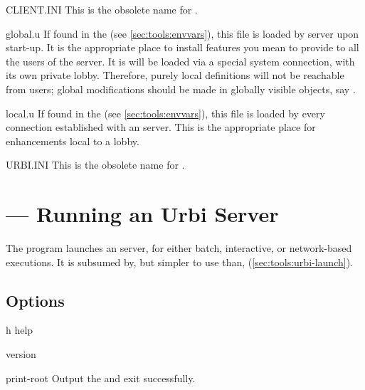 \begin{files}
\item[CLIENT.INI] This is the obsolete name for .

\item[global.u] If found in the  (see
  \autoref{sec:tools:envvars}), this file is loaded by \urbi server upon
  start-up.  It is the appropriate place to install features you
  mean to provide to all the users of the server.  It is will be
  loaded via a special system connection, with its own private lobby.
  Therefore, purely local definitions will not be reachable from
  users; global modifications should be made in globally visible
  objects, say .

\item[local.u] If found in the  (see
  \autoref{sec:tools:envvars}), this file is loaded by every
  connection established with an \urbi server.  This is the
  appropriate place for enhancements local to a lobby.

\item[URBI.INI] This is the obsolete name for .
\end{files}

\section{ --- Running an Urbi Server}
\label{sec:tools:urbi}

The  program launches an \urbi server, for either batch,
interactive, or network-based executions.  It is subsumed by, but simpler to
use than,  (\autoref{sec:tools:urbi-launch}).

\subsection{Options}

\begin{options}
\item[h]{help} \optionHelp
\item{version} \optionVersion
\item{print-root} Output the  and exit successfully.
\end{options}


